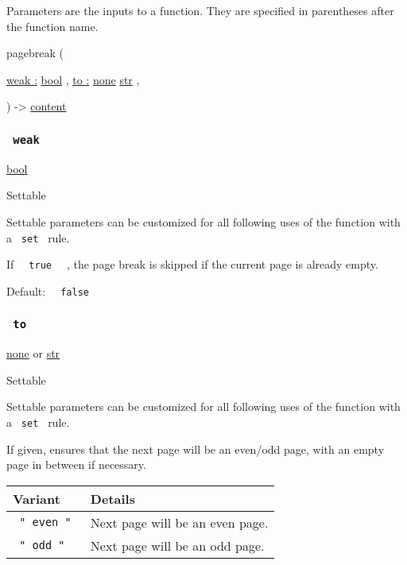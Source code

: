 \label{parameters-tooltip}
Parameters are the inputs to a function. They are specified in
parentheses after the function name.

{ pagebreak } (

{ \hyperref[parameters-weak]{weak :}
\href{/docs/reference/foundations/bool/}{bool} , } {
\hyperref[parameters-to]{to :}
\href{/docs/reference/foundations/none/}{none}
\href{/docs/reference/foundations/str/}{str} , }

) -\textgreater{} \href{/docs/reference/foundations/content/}{content}

\subsubsection{\texorpdfstring{\texttt{\ weak\ }}{ weak }}\label{parameters-weak}

\href{/docs/reference/foundations/bool/}{bool}

{{ Settable }}

\label{parameters-weak-settable-tooltip}
Settable parameters can be customized for all following uses of the
function with a \texttt{\ set\ } rule.

If \texttt{\ }{\texttt{\ true\ }}\texttt{\ } , the page break is skipped
if the current page is already empty.

Default: \texttt{\ }{\texttt{\ false\ }}\texttt{\ }

\subsubsection{\texorpdfstring{\texttt{\ to\ }}{ to }}\label{parameters-to}

\href{/docs/reference/foundations/none/}{none} {or}
\href{/docs/reference/foundations/str/}{str}

{{ Settable }}

\label{parameters-to-settable-tooltip}
Settable parameters can be customized for all following uses of the
function with a \texttt{\ set\ } rule.

If given, ensures that the next page will be an even/odd page, with an
empty page in between if necessary.

\begin{longtable}[]{@{}ll@{}}
\toprule\noalign{}
Variant & Details \\
\midrule\noalign{}
\endhead
\bottomrule\noalign{}
\endlastfoot
\texttt{\ "\ even\ "\ } & Next page will be an even page. \\
\texttt{\ "\ odd\ "\ } & Next page will be an odd page. \\
\end{longtable}

